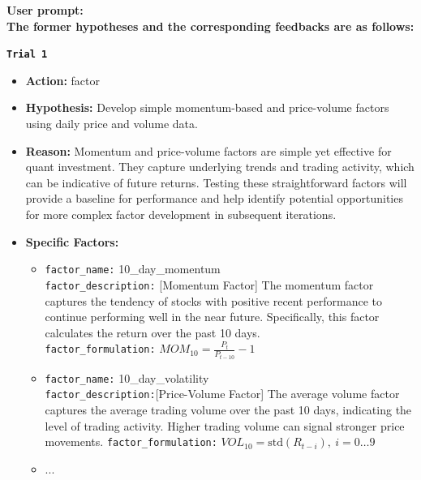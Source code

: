 \documentclass{article}
\begin{document}
\begin{tcolorbox}[
  colback=gray!5, 
  colframe=gray!80,
  title style={fontupper=\bfseries\large},
  title=Hypothesis Synthesis Prompt – Factor-Oriented,
  breakable
]
\textcolor{blue!60!black}{\textbf{User prompt:}}\\

\textbf{The former hypotheses and the corresponding feedbacks are as follows:}

\vspace{1mm}
\texttt{\textbf{Trial 1}}
\begin{itemize}
  \item \textbf{Action:} factor
  \item \textbf{Hypothesis:} Develop simple momentum-based and price-volume factors using daily price and volume data.
  \item \textbf{Reason:} Momentum and price-volume factors are simple yet effective for quant investment. They capture underlying trends and trading activity, which can be indicative of future returns. Testing these straightforward factors will provide a baseline for performance and help identify potential opportunities for more complex factor development in subsequent iterations.

  \item \textbf{Specific Factors:}
    \begin{itemize}
      \item \texttt{factor\_name:} 10\_day\_momentum\\
            \texttt{factor\_description:} [Momentum Factor] The momentum factor captures the tendency of stocks with positive recent performance to continue performing well in the near future. Specifically, this factor calculates the return over the past 10 days.\\
            \texttt{factor\_formulation:} $MOM_{10} = \frac{P_t}{P_{t-10}} - 1$
      \item \texttt{factor\_name:} 10\_day\_volatility\\
            \texttt{factor\_description:}[Price-Volume Factor] The average volume factor captures the average trading volume over the past 10 days, indicating the level of trading activity. Higher trading volume can signal stronger price movements.
            \texttt{factor\_formulation:} $VOL_{10} = \text{std}(R_{t-i}), \ i=0\ldots9$
      \item ...
    \end{itemize}


\end{itemize}
\end{tcolorbox}
\end{document}
